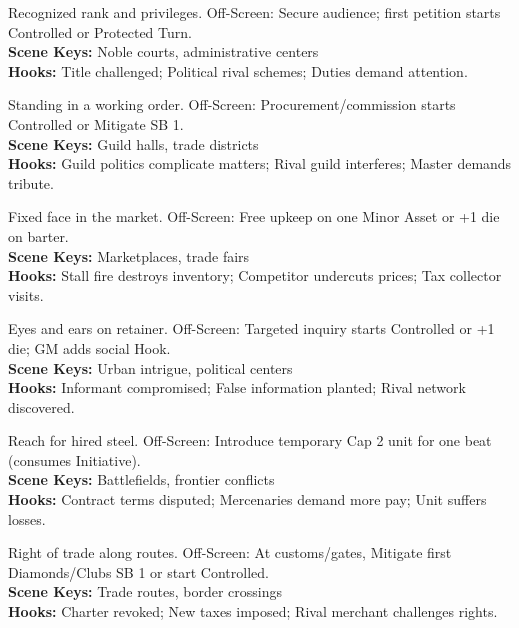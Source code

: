 \documentclass[12pt]{article}
\begin{document}
\begin{description}[leftmargin=*]
  \item[\textbf{Noble Title/Charter}] Recognized rank and privileges. Off-Screen: Secure audience; first petition starts Controlled or Protected Turn. \\
  \textbf{Scene Keys:} Noble courts, administrative centers \\
  \textbf{Hooks:} Title challenged; Political rival schemes; Duties demand attention.

  \item[\textbf{Guild Membership}] Standing in a working order. Off-Screen: Procurement/commission starts Controlled or Mitigate SB 1. \\
  \textbf{Scene Keys:} Guild halls, trade districts \\
  \textbf{Hooks:} Guild politics complicate matters; Rival guild interferes; Master demands tribute.

  \item[\textbf{Merchant Stall/Front}] Fixed face in the market. Off-Screen: Free upkeep on one Minor Asset or +1 die on barter. \\
  \textbf{Scene Keys:} Marketplaces, trade fairs \\
  \textbf{Hooks:} Stall fire destroys inventory; Competitor undercuts prices; Tax collector visits.

  \item[\textbf{Spy Ring/Informants}] Eyes and ears on retainer. Off-Screen: Targeted inquiry starts Controlled or +1 die; GM adds social Hook. \\
  \textbf{Scene Keys:} Urban intrigue, political centers \\
  \textbf{Hooks:} Informant compromised; False information planted; Rival network discovered.

  \item[\textbf{Mercenary Contract}] Reach for hired steel. Off-Screen: Introduce temporary Cap 2 unit for one beat (consumes Initiative). \\
  \textbf{Scene Keys:} Battlefields, frontier conflicts \\
  \textbf{Hooks:} Contract terms disputed; Mercenaries demand more pay; Unit suffers losses.

  \item[\textbf{Trading Charter}] Right of trade along routes. Off-Screen: At customs/gates, Mitigate first Diamonds/Clubs SB 1 or start Controlled. \\
  \textbf{Scene Keys:} Trade routes, border crossings \\
  \textbf{Hooks:} Charter revoked; New taxes imposed; Rival merchant challenges rights.


\end{description}
\end{document}
